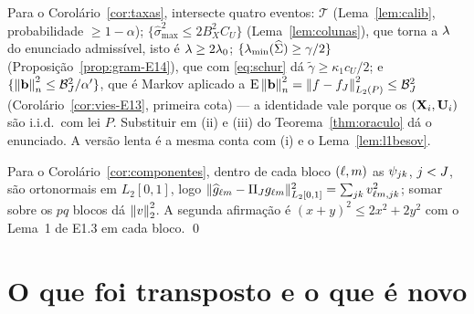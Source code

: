 \documentclass[11pt,a4paper]{article}
\newcommand{\lmin}{\lambda_{\min}}
\newcommand{\bb}{\mathbf{b}}
\newcommand{\smax}{\widehat{\sigma}_{\max}}
\newcommand{\gtil}{\widetilde{\gamma}}
\begin{document}
Para o Corolário~\ref{cor:taxas}, intersecte quatro eventos: $\mathcal{T}$
(Lema~\ref{lem:calib}, probabilidade $\ge 1-\alpha$); $\{\smax^{2} \le
2B_{X}^{2}C_{U}\}$ (Lema~\ref{lem:colunas}), que torna a $\lambda$ do enunciado
admissível, isto é $\lambda \ge 2\lambda_{0}$; $\{\lmin(\Gramhat) \ge \gamma/2\}$
(Proposição~\ref{prop:gram-E14}), que com \eqref{eq:schur} dá
$\gtil \ge \kappa_{1}c_{U}/2$; e
$\{\normn{\bb}^{2} \le \mathcal{B}_{J}^{2}/\alpha'\}$, que é Markov aplicado a
$\E\normn{\bb}^{2} = \norm{f-f_{J}}_{L_{2}(P)}^{2} \le \mathcal{B}_{J}^{2}$
(Corolário~\ref{cor:vies-E13}, primeira cota) --- a identidade vale porque os
$(\mathbf{X}_{i},\mathbf{U}_{i})$ são i.i.d.\ com lei $P$. Substituir em (ii) e (iii) do
Teorema~\ref{thm:oraculo} dá o enunciado. A versão lenta é a mesma conta com
(i) e o Lema~\ref{lem:l1besov}.

Para o Corolário~\ref{cor:componentes}, dentro de cada bloco $(\ell,m)$ as
$\psi_{jk}$, $j < J$, são ortonormais em $L_{2}[0,1]$, logo
$\lVert\widehat{g}_{\ell m} - \Pi_{J}g_{\ell m}\rVert_{L_{2}[0,1]}^{2} =
\sum_{jk}v_{\ell m,jk}^{2}$; somar sobre os $pq$ blocos dá
$\left\lVert v \right\rVert_{2}^{2}$. A segunda afirmação é $(x+y)^{2} \le 2x^{2}+2y^{2}$ com o
Lema~1 de E1.3 em cada bloco. \qed

\section{O que foi transposto e o que é novo}
\end{document}
